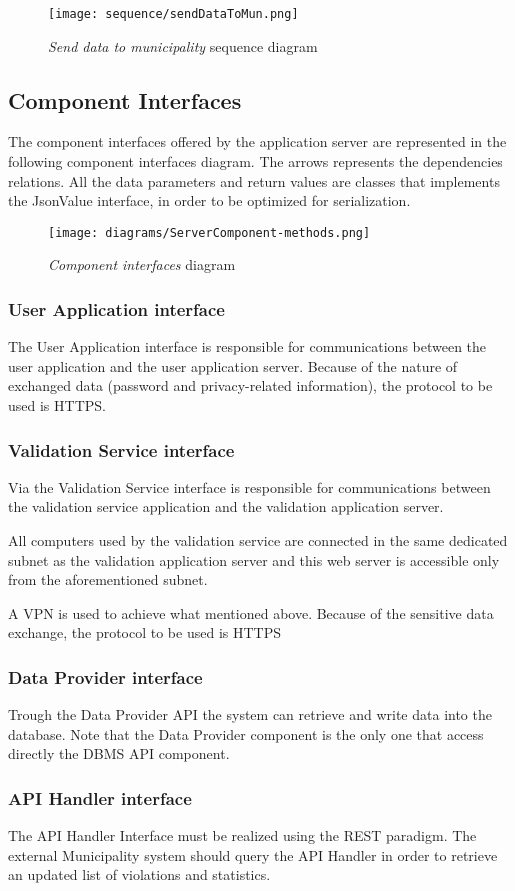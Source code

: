 \begin{figure}[h!]
	\centering
	\texttt{[image: sequence/sendDataToMun.png]}
	\caption{
		\label{fig:sendDataToMun} 
		\emph{Send data to municipality} sequence diagram
	}
\end{figure}
\clearpage


\subsection{Component Interfaces}
The component interfaces offered by the application server are represented in the following component interfaces diagram.
The arrows represents the dependencies relations. All the data parameters and return values are classes that implements the JsonValue interface, in order to be optimized for serialization.\\


\begin{figure}[h!]
	\centering
	\texttt{[image: diagrams/ServerComponent-methods.png]}
	\caption{
		\label{fig:sendDataToMun} 
		\emph{Component interfaces} diagram
	}
\end{figure}

\subsubsection{User Application interface}
The User Application interface is responsible for communications between the user application and the user application server.
Because of the nature of exchanged data (password and privacy-related information), the protocol to be used is HTTPS.

\subsubsection{Validation Service interface}
Via the Validation Service interface is responsible for communications between the validation service application and the validation application server.

All computers used by the validation service are connected in the same dedicated subnet as the validation application server and this web server is accessible only from the aforementioned subnet. 

A VPN is used to achieve what mentioned above. Because of the sensitive data exchange, the protocol to be used is HTTPS

\subsubsection{Data Provider interface}
Trough the Data Provider API the system can retrieve and write data into the database. Note that the Data Provider component is the only one that access directly the DBMS API component.

\subsubsection{API Handler interface}
The API Handler Interface must be realized using the REST paradigm. The external Municipality system should query the API Handler
in order to retrieve an updated list of violations and statistics. 


